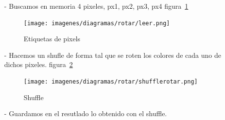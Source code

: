 \documentclass[a4paper]{article}
\begin{document}
\begin{itemize}
    \itemsep0em
    \item[-]
        Buscamos en memoria 4 pixeles, px1, px2, px3, px4 figura~\ref{leer}
        \begin{figure}[!htb]
          \begin{center}
        	\texttt{[image: imagenes/diagramas/rotar/leer.png]}
        	\caption{Etiquetas de pixels}
        	\label{leer}
          \end{center}
        \end{figure}
    \item[-]
        Hacemos un shufle de forma tal que se roten los colores de cada uno de dichos pixeles.
         figura~\ref{shufflerotar}
        \begin{figure}[!htb]
          \begin{center}
        	\texttt{[image: imagenes/diagramas/rotar/shufflerotar.png]}
        	\caption{Shuffle}
        	\label{shufflerotar}
          \end{center}
        \end{figure}
    \item[-]
        Guardamos en el resutlado lo obtenido con el shuffle.
   \end{itemize}
   
\end{document}
